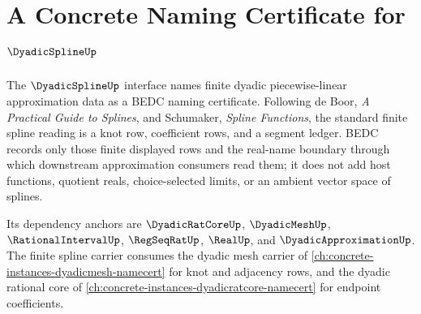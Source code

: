 \chapter{A Concrete Naming Certificate for $\DyadicSplineUp$}
\label{ch:concrete-instances-dyadicspline-namecert}

The $\DyadicSplineUp$ interface names finite dyadic piecewise-linear approximation data as a BEDC naming certificate. Following de Boor, \emph{A Practical Guide to Splines}, and Schumaker, \emph{Spline Functions}, the standard finite spline reading is a knot row, coefficient rows, and a segment ledger. BEDC records only those finite displayed rows and the real-name boundary through which downstream approximation consumers read them; it does not add host functions, quotient reals, choice-selected limits, or an ambient vector space of splines.

Its dependency anchors are $\DyadicRatCoreUp$, $\DyadicMeshUp$, $\RationalIntervalUp$, $\RegSeqRatUp$, $\RealUp$, and $\DyadicApproximationUp$. The finite spline carrier consumes the dyadic mesh carrier of \autoref{ch:concrete-instances-dyadicmesh-namecert} for knot and adjacency rows, and the dyadic rational core of \autoref{ch:concrete-instances-dyadicratcore-namecert} for endpoint coefficients.

